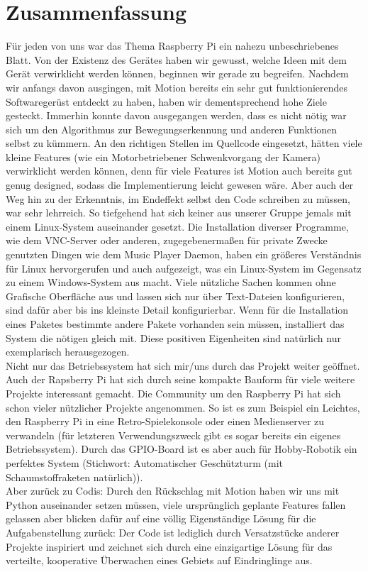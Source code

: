 \documentclass[journal]{IEEEtran}
\begin{document}
\section{Zusammenfassung}
Für jeden von uns war das Thema Raspberry Pi ein nahezu unbeschriebenes Blatt. Von der Existenz des Gerätes haben wir gewusst, welche Ideen mit dem Gerät verwirklicht werden können, beginnen wir gerade zu begreifen. Nachdem wir anfangs davon ausgingen, mit Motion bereits ein sehr gut funktionierendes Softwaregerüst entdeckt zu haben, haben wir dementsprechend hohe Ziele gesteckt. Immerhin konnte davon ausgegangen werden, dass es nicht nötig war sich um den Algorithmus zur Bewegungserkennung und anderen Funktionen selbst zu kümmern. An den richtigen Stellen im Quellcode eingesetzt, hätten viele kleine Features (wie ein Motorbetriebener Schwenkvorgang der Kamera) verwirklicht werden können, denn für viele Features ist Motion auch bereits gut genug designed, sodass die Implementierung leicht gewesen wäre. Aber auch der Weg hin zu der Erkenntnis, im Endeffekt selbst den Code schreiben zu müssen, war sehr lehrreich. So tiefgehend hat sich keiner aus unserer Gruppe jemals mit einem Linux-System auseinander gesetzt. Die Installation diverser Programme, wie dem VNC-Server oder anderen, zugegebenermaßen für private Zwecke genutzten Dingen wie dem Music Player Daemon, haben ein größeres Verständnis für Linux hervorgerufen und auch aufgezeigt, was ein Linux-System im Gegensatz zu einem Windows-System aus macht. Viele nützliche Sachen kommen ohne Grafische Oberfläche aus und lassen sich nur über Text-Dateien konfigurieren, sind dafür aber bis ins kleinste Detail konfigurierbar. Wenn für die Installation eines Paketes bestimmte andere Pakete vorhanden sein müssen, installiert das System die nötigen gleich mit. Diese positiven Eigenheiten sind natürlich nur exemplarisch herausgezogen. \\Nicht nur das Betriebssystem hat sich mir/uns durch das Projekt weiter geöffnet. Auch der Rapsberry Pi hat sich durch seine kompakte Bauform für viele weitere Projekte interessant gemacht. Die Community um den Raspberry Pi hat sich schon vieler nützlicher Projekte angenommen. So ist es zum Beispiel ein Leichtes, den Raspberry Pi in eine Retro-Spielekonsole oder einen Medienserver zu verwandeln (für letzteren Verwendungszweck gibt es sogar bereits ein eigenes Betriebssystem). Durch das GPIO-Board ist es aber auch für Hobby-Robotik ein perfektes System (Stichwort: Automatischer Geschützturm (mit Schaumstoffraketen natürlich)). \\Aber zurück zu Codis: Durch den Rückschlag mit Motion haben wir uns mit Python auseinander setzen müssen, viele ursprünglich geplante Features fallen gelassen aber blicken dafür auf eine völlig Eigenständige Lösung für die Aufgabenstellung zurück: Der Code ist lediglich durch Versatzstücke anderer Projekte inspiriert und zeichnet sich durch eine einzigartige Lösung für das verteilte, kooperative Überwachen eines Gebiets auf Eindringlinge aus. 




\printbibliography
\end{document}
